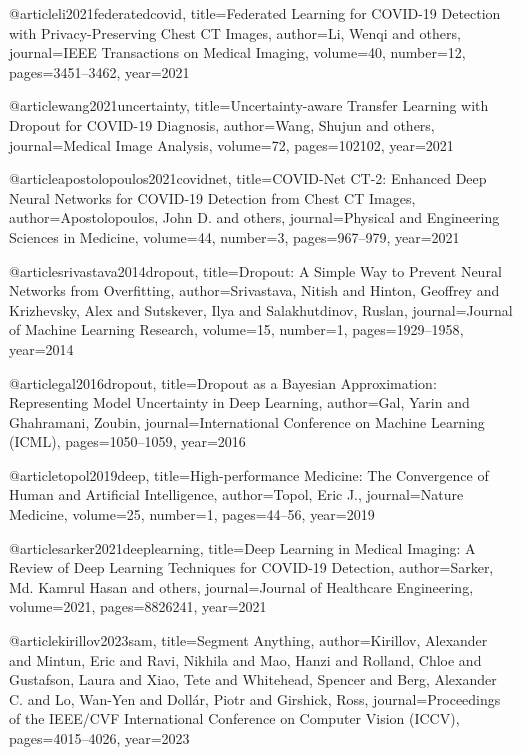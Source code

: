 @article{li2021federatedcovid,
  title={Federated Learning for COVID-19 Detection with Privacy-Preserving Chest CT Images},
  author={Li, Wenqi and others},
  journal={IEEE Transactions on Medical Imaging},
  volume={40},
  number={12},
  pages={3451--3462},
  year={2021}
}

@article{wang2021uncertainty,
  title={Uncertainty-aware Transfer Learning with Dropout for COVID-19 Diagnosis},
  author={Wang, Shujun and others},
  journal={Medical Image Analysis},
  volume={72},
  pages={102102},
  year={2021}
}

@article{apostolopoulos2021covidnet,
  title={COVID-Net CT-2: Enhanced Deep Neural Networks for COVID-19 Detection from Chest CT Images},
  author={Apostolopoulos, John D. and others},
  journal={Physical and Engineering Sciences in Medicine},
  volume={44},
  number={3},
  pages={967--979},
  year={2021}
}

@article{srivastava2014dropout,
  title={Dropout: A Simple Way to Prevent Neural Networks from Overfitting},
  author={Srivastava, Nitish and Hinton, Geoffrey and Krizhevsky, Alex and Sutskever, Ilya and Salakhutdinov, Ruslan},
  journal={Journal of Machine Learning Research},
  volume={15},
  number={1},
  pages={1929--1958},
  year={2014}
}

@article{gal2016dropout,
  title={Dropout as a Bayesian Approximation: Representing Model Uncertainty in Deep Learning},
  author={Gal, Yarin and Ghahramani, Zoubin},
  journal={International Conference on Machine Learning (ICML)},
  pages={1050--1059},
  year={2016}
}

@article{topol2019deep,
  title={High-performance Medicine: The Convergence of Human and Artificial Intelligence},
  author={Topol, Eric J.},
  journal={Nature Medicine},
  volume={25},
  number={1},
  pages={44--56},
  year={2019}
}

@article{sarker2021deeplearning,
  title={Deep Learning in Medical Imaging: A Review of Deep Learning Techniques for COVID-19 Detection},
  author={Sarker, Md. Kamrul Hasan and others},
  journal={Journal of Healthcare Engineering},
  volume={2021},
  pages={8826241},
  year={2021}
}

@article{kirillov2023sam,
  title={Segment Anything},
  author={Kirillov, Alexander and Mintun, Eric and Ravi, Nikhila and Mao, Hanzi and Rolland, Chloe and Gustafson, Laura and Xiao, Tete and Whitehead, Spencer and Berg, Alexander C. and Lo, Wan-Yen and Doll{\'a}r, Piotr and Girshick, Ross},
  journal={Proceedings of the IEEE/CVF International Conference on Computer Vision (ICCV)},
  pages={4015--4026},
  year={2023}
}


